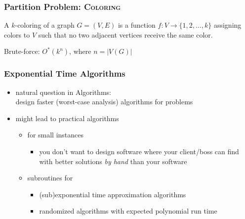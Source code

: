 \begin{frame}
	\frametitle{Partition Problem: \textsc{Coloring}}

	\noindent
	A \alert{$k$-coloring} of a graph $G=(V,E)$ is a function $f:V \rightarrow \{1,2, \ldots,k\}$ assigning colors to $V$ such that no two adjacent vertices receive the same color.


	\begin{center}
	\end{center}

	\noindent
	Brute-force: \pause{}$O^*(k^n)$, where $n=|V(G)|$

\end{frame}


\begin{frame}
	\frametitle{Exponential Time Algorithms}

	\begin{itemize}
		\item natural question in Algorithms:\\
		      design faster (worst-case analysis) algorithms for problems
		      \bigskip
		\item might lead to practical algorithms
		      \begin{itemize}
			      \item for small instances
			            \begin{itemize}
				            \item you don't want to design software where your client/boss can find with better solutions \emph{by hand} than your software
			            \end{itemize}
			      \item subroutines for
			            \begin{itemize}
				            \item (sub)exponential time approximation algorithms
				            \item randomized algorithms with expected polynomial run time
			            \end{itemize}
		      \end{itemize}
	\end{itemize}
\end{frame}


